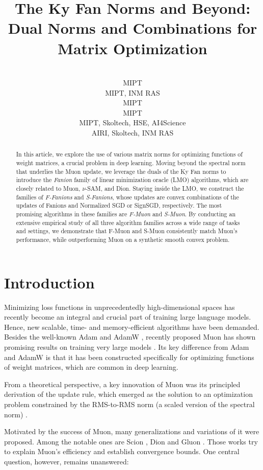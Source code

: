 \documentclass[pmlr]{jmlr}%
\title[Ky Fan Norms, Duals, and Norm Combinations for Matrix Optimization]{The Ky Fan Norms and Beyond: Dual Norms and Combinations for Matrix Optimization}
\author{\Name{Alexey Kravatskiy}
        \Email{kravtskii.aiu@phystech.edu}\\
        \addr MIPT
        \AND
        \Name{Ivan Kozyrev}
        \Email{kozyrev.in@phystech.edu}\\
        \addr MIPT, INM RAS
        \AND
        \Name{Nikolai Kozlov}
        \Email{kozlov.na@phystech.edu}\\
        \addr MIPT
        \AND
        \Name{Alexander Vinogradov}
        \Email{vinogradov.am@phystech.edu}\\
        \addr MIPT
        \AND
        \Name{Daniil Merkulov}
        \Email{daniil.merkulov@phystech.edu}\\
        \addr MIPT, Skoltech, HSE, AI4Science
        \AND
        \Name{Ivan Oseledets}
        \Email{i.oseledets@skoltech.ru}\\
        \addr AIRI, Skoltech, INM RAS
 }
\begin{document}
 
 \maketitle
 
 \begin{abstract}
   In this article, we explore the use of various matrix norms for optimizing functions of weight matrices, a crucial problem in deep learning. Moving beyond the spectral norm that underlies the Muon update, we leverage the duals of the Ky Fan norms to introduce the \emph{Fanion} family of linear minimization oracle (LMO) algorithms, which are closely related to Muon, $\nu$-SAM, and Dion. Staying inside the LMO, we construct the families of \emph{F-Fanions} and \emph{S-Fanions}, whose updates are convex combinations of the updates of Fanions and Normalized SGD or SignSGD, respectively. The most promising algorithms in these families are \emph{F-Muon} and \emph{S-Muon}. By conducting an extensive empirical study of all three algorithm families across a wide range of tasks and settings, we demonstrate that F-Muon and S-Muon consistently match Muon's performance, while outperforming Muon on a synthetic smooth convex problem.
 \end{abstract}
 
 \section{Introduction}
 
 Minimizing loss functions in unprecedentedly high-dimensional spaces has recently become an integral and crucial part of training large language models. Hence, new scalable, time- and memory-efficient algorithms have been demanded. Besides the well-known Adam \citep{kingma2014adam} and AdamW \citep{loshchilov2017decoupled}, recently proposed Muon \citep{jordan2024muon} has shown promising results on training very large models \citep{liu2025muon}. Its key difference from Adam and AdamW is that it has been constructed specifically for optimizing functions of weight matrices, which are common in deep learning.
 
 From a theoretical perspective, a key innovation of Muon was its principled derivation of the update rule, which emerged as the solution to an optimization problem constrained by the RMS-to-RMS norm (a scaled version of the spectral norm) \citep{bernstein2025deriving}.
 
 Motivated by the success of Muon, many generalizations and variations of it were proposed. Among the notable ones are Scion \citep{pethick2025training}, Dion \citep{ahn2025dion} and Gluon \citep{riabinin2025gluon}. Those works try to explain Muon's efficiency and establish convergence bounds. One central question, however, remains unanswered:
 
\end{document}
